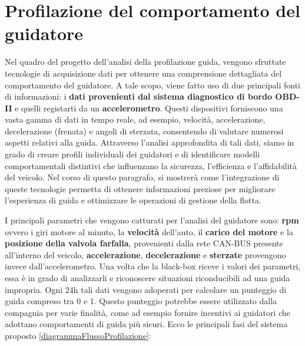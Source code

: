 \documentclass[12pt, a4paper, italian]{report}
\numberwithin{figure}{chapter}
\numberwithin{table}{chapter}
\begin{document}
\section{Profilazione del comportamento del guidatore}
\label{sec:AnalisiProfilazione}
Nel quadro del progetto dell'analisi della profilazione guida, vengono sfruttate tecnologie di acquisizione dati per ottenere una comprensione dettagliata del comportamento del guidatore. A tale scopo, viene fatto uso di due principali fonti di informazioni: i \textbf{dati provenienti dal sistema diagnostico di bordo OBD-II} e quelli registarti da un \textbf{accelerometro}. Questi dispositivi forniscono una vasta gamma di dati in tempo reale, ad esempio, velocità, accelerazione, decelerazione (frenata) e angoli di sterzata, consentendo di valutare numerosi aspetti relativi alla guida. Attraverso l'analisi approfondita di tali dati, siamo in grado di creare profili individuali dei guidatori e di identificare modelli comportamentali distintivi che influenzano la sicurezza, l'efficienza e l'affidabilità del veicolo. Nel corso di questo paragrafo, si mostrerà come l'integrazione di queste tecnologie permetta di ottenere informazioni preziose per migliorare l'esperienza di guida e ottimizzare le operazioni di gestione della flotta.

\vspace{0.5cm} 

I principali parametri che vengono catturati per l'analisi del guidatore sono: \textbf{rpm} ovvero i giri motore al minuto, la \textbf{velocità} dell'auto, il \textbf{carico del motore} e la \textbf{posizione della valvola farfalla}, provenienti dalla rete CAN-BUS presente all'interno del veicolo, \textbf{accelerazione}, \textbf{decelerazione} e \textbf{sterzate} provengono invece dall'accelerometro. Una volta che la black-box riceve i valori dei parametri, essa è in grado di analizzarli e riconoscere situazioni riconducibili ad una guida impropria. Ogni 24h tali dati vengono adoperati per calcolare un punteggio di guida compreso tra 0 e 1. Questo punteggio potrebbe essere utilizzato dalla compagnia per varie finalità, come ad esempio fornire incentivi ai guidatori che adottano comportamenti di guida più sicuri. Ecco le principali fasi del sistema proposto \ref{diagrammaFlussoProfilazione}:
\end{document}

